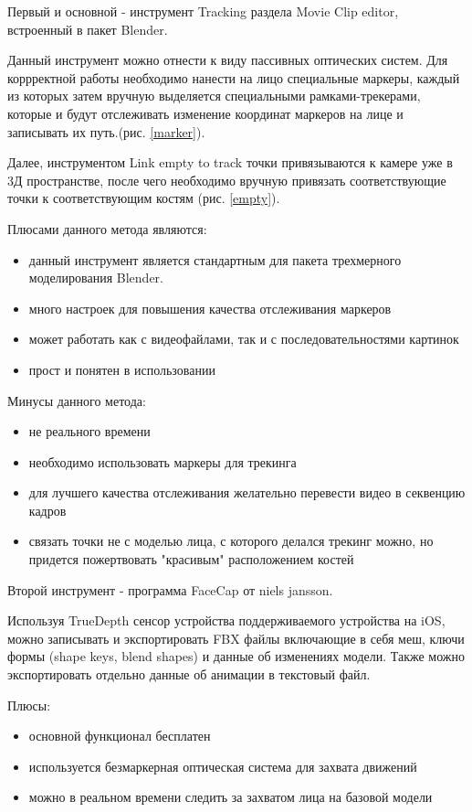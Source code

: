 Первый и основной - инструмент Tracking раздела Movie Clip editor, встроенный в пакет Blender.

Данный инструмент можно отнести к виду пассивных оптических систем. Для коррректной работы необходимо нанести на лицо специальные маркеры, каждый из которых затем вручную выделяется специальными рамками-трекерами, которые и будут отслеживать изменение координат маркеров на лице и записывать их путь.(рис. \ref{marker}).

Далее, инструментом Link empty to track точки привязываются к камере уже в 3Д пространстве, после чего необходимо вручную привязать соответствующие точки к соответствующим костям (рис. \ref{empty}).

Плюсами данного метода являются:
\begin{itemize}
	\item данный инструмент является стандартным для пакета трехмерного моделирования Blender.
	\item много настроек для повышения качества отслеживания маркеров
	\item может работать как с видеофайлами, так и с последовательностями картинок
	\item прост и понятен в использовании
\end{itemize}
Минусы данного метода:
\begin{itemize}
	\item не реального времени
	\item необходимо использовать маркеры для трекинга
	\item для лучшего качества отслеживания желательно перевести видео в секвенцию кадров
	\item связать точки не с моделью лица, с которого делался трекинг можно, но придется пожертвовать "красивым" расположением костей
\end{itemize}

Второй инструмент - программа FaceCap от niels jansson. 

Используя TrueDepth сенсор устройства поддерживаемого устройства на iOS, можно записывать и экспортировать FBX файлы включающие в себя меш, ключи формы (shape keys, blend shapes) и данные об изменениях модели. Также можно экспортировать отдельно данные об анимации в текстовый файл.

Плюсы:
\begin{itemize}
	\item основной функционал бесплатен
	\item используется безмаркерная оптическая система для захвата движений
	\item можно в реальном времени следить за захватом лица на базовой модели
\end{itemize}


